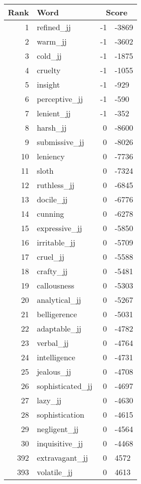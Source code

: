 \begin{longtable}[!htbp]{| rlr@{.}l |}
    \hline
    \textbf{Rank} & \textbf{Word} & \multicolumn{2}{c|}{\textbf{Score}} \\
    \hline
    \endhead
    1 & refined\_jj & -1 & -3869 \\
    2 & warm\_jj & -1 & -3602 \\
    3 & cold\_jj & -1 & -1875 \\
    4 & cruelty & -1 & -1055 \\
    5 & insight & -1 & -929 \\
    6 & perceptive\_jj & -1 & -590 \\
    7 & lenient\_jj & -1 & -352 \\
    8 & harsh\_jj & 0 & -8600 \\
    9 & submissive\_jj & 0 & -8026 \\
    10 & leniency & 0 & -7736 \\
    11 & sloth & 0 & -7324 \\
    12 & ruthless\_jj & 0 & -6845 \\
    13 & docile\_jj & 0 & -6776 \\
    14 & cunning & 0 & -6278 \\
    15 & expressive\_jj & 0 & -5850 \\
    16 & irritable\_jj & 0 & -5709 \\
    17 & cruel\_jj & 0 & -5588 \\
    18 & crafty\_jj & 0 & -5481 \\
    19 & callousness & 0 & -5303 \\
    20 & analytical\_jj & 0 & -5267 \\
    21 & belligerence & 0 & -5031 \\
    22 & adaptable\_jj & 0 & -4782 \\
    23 & verbal\_jj & 0 & -4764 \\
    24 & intelligence & 0 & -4731 \\
    25 & jealous\_jj & 0 & -4708 \\
    26 & sophisticated\_jj & 0 & -4697 \\
    27 & lazy\_jj & 0 & -4630 \\
    28 & sophistication & 0 & -4615 \\
    29 & negligent\_jj & 0 & -4564 \\
    30 & inquisitive\_jj & 0 & -4468 \\
    392 & extravagant\_jj & 0 & 4572 \\
    393 & volatile\_jj & 0 & 4613 \\

\end{longtable}
